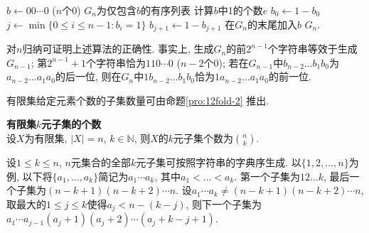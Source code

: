 \begin{algorithm}[ht!]
\caption{生成$n$阶二进制反射Gray码} 
\label{alg:gray}
$b \leftarrow 00\cdots 0$ ($n$个0)\;
$G_n$为仅包含$b$的有序列表\;
{
    计算$b$中1的个数$e$\;
    {$b_0\leftarrow 1-b_0$\;}
    {$j \leftarrow \min \{0\le i \le n-1: b_i=1\}$\;
    $b_{j+1}\leftarrow 1-b_{j+1}$\;
    }
    在$G_n$的末尾加入$b$\;
}
\Return $G_n$.
\end{algorithm}
对$n$归纳可证明上述算法的正确性. 事实上, 生成$G_n$的前$2^{n-1}$个字符串等效于生成$G_{n-1}$; 第$2^{n-1}+1$个字符串恰为$110\cdots 0$ ($n-2$个0); 若在$G_{n-1}$中$b_{n-2}\dots b_1b_0$为$a_{n-2}\dots a_1a_0$的后一位, 则在$G_{n}$中$1b_{n-2}\dots b_1b_0$恰为$1a_{n-2}\dots a_1a_0$的前一位. 

\par 有限集给定元素个数的子集数量可由命题\ref{pro:12fold-2} 推出. 

\begin{col}
\textbf{有限集$k$元子集的个数}\\
设$X$为有限集, $|X|=n$, $k \in \mathbb{N}$, 则$X$的$k$元子集个数为$\binom{n}{k}$.
\label{col:setsize}
\end{col}

\par 设$1\le k \le n$, $n$元集合的全部$k$元子集可按照字符串的字典序生成. 以$\{1,2,\dots,n\}$为例, 以下将$\{a_1,\dots,a_k\}$简记为$a_1\cdots a_k$, 其中$a_1<\dots<a_k$. 第一个子集为$12\dots k$, 最后一个子集为$(n-k+1)(n-k+2)\cdots n$. 设$a_1\cdots a_k \neq (n-k+1)(n-k+2)\cdots n$, 取最大的$1\le j\le k$使得$a_j < n-(k-j)$, 则下一个子集为$a_1\cdots a_{j-1}(a_j+1)(a_j+2)\cdots(a_j+k-j+1)$. 

